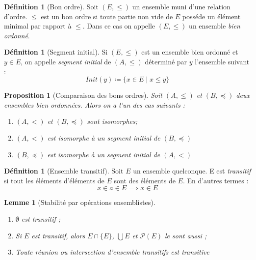 \documentclass{article}
\theoremstyle{definition}
\newtheorem{definition}[subsubsection]{Définition}
\theoremstyle{plain}
\newtheorem{proposition}[subsubsection]{Proposition}
\theoremstyle{plain}
\theoremstyle{plain}
\newtheorem{lemma}[subsubsection]{Lemme}
\theoremstyle{plain}
\begin{document}
\begin{definition}[Bon ordre]
	Soit \( (E,\le) \) un ensemble muni d'une relation d'ordre. \( \le \) est un bon ordre si toute partie non vide de \( E \) posséde un élément minimal par rapport à \( \le \). Dans ce cas on appelle \( (E,\le) \) un ensemble \textit{bien ordonné}.	
\end{definition}

\begin{definition}[Segment initial]
	Si \( (E,\le) \) est un ensemble bien ordonné et \( y \in E\), on appelle \textit{segment initial} de \( (A,\le) \) déterminé par \( y \) l'ensemble suivant :
	\begin{equation*}
		Init(y) \coloneqq \{ x \in E \mid x \le y \}
	\end{equation*}
\end{definition}

\begin{proposition}[Comparaison des bons ordres]
	Soit \( (A,\le) \) et \( (B,\preceq) \) deux ensembles bien ordonnées. Alors on a l'un des cas suivants :
	\begin{enumerate}[label = (\roman*)]
		\item \( (A,<) \) et \( (B,\preceq) \) sont isomorphes;
		\item \( (A,<) \) est isomorphe à un segment initial de \( (B,\preceq) \)
		\item \( (B,\preceq) \) est isomorphe à un segment initial de \( (A,<) \)
	\end{enumerate}
\end{proposition}

\begin{definition}[Ensemble transitif]
	Soit \( E \) un ensemble quelconque. E est \textit{transitif} si tout les éléments d'éléments de \( E \) sont des éléments de \( E \). En d'autres termes :
	\begin{equation}\label{eq:Tr} \tag{Tr}
		x \in a \in E \implies x \in E 
	\end{equation}
\end{definition}

\begin{lemma}[Stabilité par opérations ensemblistes]
	\begin{enumerate}[label = (\roman*)]
		\item \( \emptyset \) est transitif ;
		\item Si \( E \) est transitif, alors \( E \cap \{E\} \), \( \bigcup E \) et \( \mathcal{P}(E) \) le sont aussi ;
		\item Toute réunion ou intersection d'ensemble transitifs est transitive
	\end{enumerate}
\end{lemma}
\end{document}

